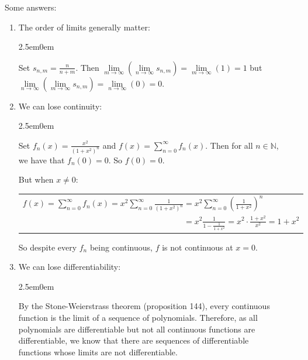 \documentclass{book}
\newcommand{\exTwo}{%
   \color{RedViolet}%
   \fontsize{13}{15}\selectfont%
}
\newenvironment{myIndent}{%
   \begin{adjustwidth}{2.5em}{0em}%
}{%
   \end{adjustwidth}%
}
\newcommand{\retTwo}{\hfill\bigbreak}
\begin{document}
Some answers:
\begin{enumerate}
   \item The order of limits generally matter:
   {\begin{myIndent}\exTwo
      Set $s_{n,m} = \frac{n}{n + m}$. Then $\lim\limits_{m\rightarrow \infty}\left(\lim\limits_{n\rightarrow \infty} s_{n,m}\right) = \lim\limits_{m\rightarrow \infty} (1) = 1$ but\\ $\lim\limits_{n\rightarrow \infty}\left(\lim\limits_{m\rightarrow \infty} s_{n,m}\right) = \lim\limits_{n\rightarrow \infty} (0) = 0$.\retTwo
   \end{myIndent}}

   \item We can lose continuity:
   {\begin{myIndent}\exTwo
      Set $f_n(x) = \frac{x^2}{(1+x^2)^n}$ and $f(x) = \sum\limits_{n=0}^\infty f_n(x)$. Then for all $n \in \mathbb{N}$,\\ we have that $f_n(0) = 0$. So $f(0) = 0$.\retTwo

      But when $x \neq 0$:
      \begin{center}
         \begin{tabular}{l}
            $f(x) = \sum\limits_{n=0}^\infty f_n(x) = x^2\sum\limits_{n=0}^\infty\frac{1}{(1+x^2)^n} = x^2\sum\limits_{n=0}^\infty\left(\frac{1}{1+x^2}\right)^n$\\
            $\phantom{f(x) = \sum\limits_{n=0}^\infty f_n(x) = x^2\sum\limits_{n=0}^\infty\frac{1}{(1+x^2)^n}} = x^2\frac{1}{1 - \frac{1}{1 + x^2}} = x^2\cdot\frac{1 + x^2}{x^2} = 1 + x^2$
         \end{tabular}
      \end{center}

      \newpage

      So despite every $f_n$ being continuous, $f$ is not continuous at $x = 0$.\retTwo
   \end{myIndent}}

   \item We can lose differentiability:
   
   {\begin{myIndent}\exTwo
      By the Stone-Weierstrass theorem (proposition 144), every continuous\\ function is the limit of a sequence of polynomials. Therefore, as all\\ polynomials are differentiable but not all continuous functions are\\ differentiable, we know that there are sequences of differentiable\\ functions whose limits are not differentiable.
      \retTwo
   \end{myIndent}}


\end{enumerate}
\end{document}
